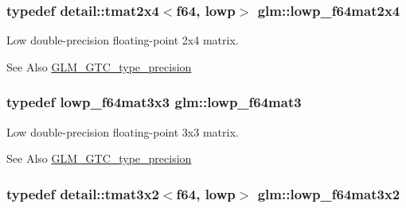 \hypertarget{group__gtc__type__precision_ga38366c50f2a2755c49110c7fc1441683}{
\subsubsection[{lowp\-\_\-f64mat2x4}]{\setlength{\rightskip}{0pt plus 5cm}typedef detail\-::tmat2x4$<$f64, lowp$>$ {\bf glm\-::lowp\-\_\-f64mat2x4}}}\label{group__gtc__type__precision_ga38366c50f2a2755c49110c7fc1441683}
Low double-\/precision floating-\/point 2x4 matrix. \begin{DoxySeeAlso}{See Also}
\hyperlink{group__gtc__type__precision}{G\-L\-M\-\_\-\-G\-T\-C\-\_\-type\-\_\-precision} 
\end{DoxySeeAlso}
\hypertarget{group__gtc__type__precision_ga4acbda53fb7ff9568c0a2786fad450b8}{
\subsubsection[{lowp\-\_\-f64mat3}]{\setlength{\rightskip}{0pt plus 5cm}typedef lowp\-\_\-f64mat3x3 {\bf glm\-::lowp\-\_\-f64mat3}}}\label{group__gtc__type__precision_ga4acbda53fb7ff9568c0a2786fad450b8}
Low double-\/precision floating-\/point 3x3 matrix. \begin{DoxySeeAlso}{See Also}
\hyperlink{group__gtc__type__precision}{G\-L\-M\-\_\-\-G\-T\-C\-\_\-type\-\_\-precision} 
\end{DoxySeeAlso}
\hypertarget{group__gtc__type__precision_ga99f6455a37a4c407a26981561184c76d}{
\subsubsection[{lowp\-\_\-f64mat3x2}]{\setlength{\rightskip}{0pt plus 5cm}typedef detail\-::tmat3x2$<$f64, lowp$>$ {\bf glm\-::lowp\-\_\-f64mat3x2}}}\label{group__gtc__type__precision_ga99f6455a37a4c407a26981561184c76d}
